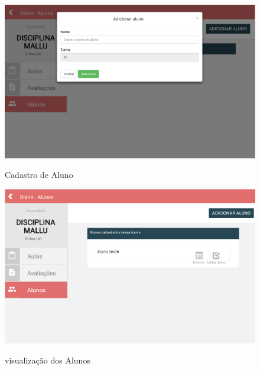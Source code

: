 \begin{figure}[!htb]
	\centering
	\caption{Cadastro de Aluno} %
	\includegraphics[scale=0.4]{cadastrarAluno}\\  %
	{\small } %
	\label{fig:cadastrarAluno} %
\end{figure}

\begin{figure}[!htb]
	\centering
	\caption{visualização dos Alunos } %
	\includegraphics[scale=0.4]{visualizaAlunos}\\  %
	{\small } %
	\label{visualizaAlunos} %
\end{figure}

